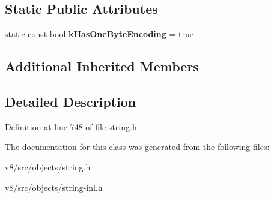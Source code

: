 \subsection*{Static Public Attributes}
\begin{DoxyCompactItemize}
\item 
\mbox{\label{classv8_1_1internal_1_1ExternalOneByteString_a1cf34a0b111fb41fca7f45c50157ee8c}} 
static const \mbox{\hyperlink{classbool}{bool}} {\bfseries k\+Has\+One\+Byte\+Encoding} = true
\end{DoxyCompactItemize}
\subsection*{Additional Inherited Members}


\subsection{Detailed Description}


Definition at line 748 of file string.\+h.



The documentation for this class was generated from the following files\+:\begin{DoxyCompactItemize}
\item 
v8/src/objects/string.\+h\item 
v8/src/objects/string-\/inl.\+h\end{DoxyCompactItemize}
